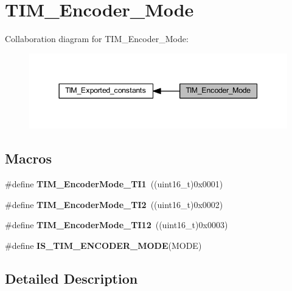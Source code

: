 \hypertarget{group___t_i_m___encoder___mode}{}\section{T\+I\+M\+\_\+\+Encoder\+\_\+\+Mode}
\label{group___t_i_m___encoder___mode}
Collaboration diagram for T\+I\+M\+\_\+\+Encoder\+\_\+\+Mode\+:
\nopagebreak
\begin{figure}[H]
\begin{center}
\leavevmode
\includegraphics[width=344pt]{group___t_i_m___encoder___mode}
\end{center}
\end{figure}
\subsection*{Macros}
\begin{DoxyCompactItemize}
\item 
\mbox{\label{group___t_i_m___encoder___mode_gabc63e3617a938382f87439ec58768b8e}} 
\#define {\bfseries T\+I\+M\+\_\+\+Encoder\+Mode\+\_\+\+T\+I1}~((uint16\+\_\+t)0x0001)
\item 
\mbox{\label{group___t_i_m___encoder___mode_ga5627a2d5d47b7301c7dbb29d20ae00e3}} 
\#define {\bfseries T\+I\+M\+\_\+\+Encoder\+Mode\+\_\+\+T\+I2}~((uint16\+\_\+t)0x0002)
\item 
\mbox{\label{group___t_i_m___encoder___mode_ga12511f903de08f1a634ff7828757f081}} 
\#define {\bfseries T\+I\+M\+\_\+\+Encoder\+Mode\+\_\+\+T\+I12}~((uint16\+\_\+t)0x0003)
\item 
\#define {\bfseries I\+S\+\_\+\+T\+I\+M\+\_\+\+E\+N\+C\+O\+D\+E\+R\+\_\+\+M\+O\+DE}(M\+O\+DE)
\end{DoxyCompactItemize}


\subsection{Detailed Description}


